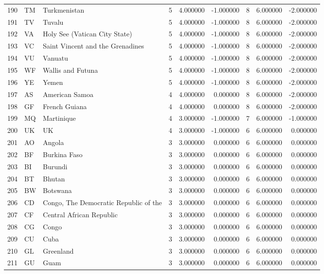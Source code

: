 \begin{tabular}{lllrrrrrr}
190 & TM & Turkmenistan & 5 & 4.000000 & -1.000000 & 8 & 6.000000 & -2.000000 \\
191 & TV & Tuvalu & 5 & 4.000000 & -1.000000 & 8 & 6.000000 & -2.000000 \\
192 & VA & Holy See (Vatican City State) & 5 & 4.000000 & -1.000000 & 8 & 6.000000 & -2.000000 \\
193 & VC & Saint Vincent and the Grenadines & 5 & 4.000000 & -1.000000 & 8 & 6.000000 & -2.000000 \\
194 & VU & Vanuatu & 5 & 4.000000 & -1.000000 & 8 & 6.000000 & -2.000000 \\
195 & WF & Wallis and Futuna & 5 & 4.000000 & -1.000000 & 8 & 6.000000 & -2.000000 \\
196 & YE & Yemen & 5 & 4.000000 & -1.000000 & 8 & 6.000000 & -2.000000 \\
197 & AS & American Samoa & 4 & 4.000000 & 0.000000 & 8 & 6.000000 & -2.000000 \\
198 & GF & French Guiana & 4 & 4.000000 & 0.000000 & 8 & 6.000000 & -2.000000 \\
199 & MQ & Martinique & 4 & 3.000000 & -1.000000 & 7 & 6.000000 & -1.000000 \\
200 & UK & UK & 4 & 3.000000 & -1.000000 & 6 & 6.000000 & 0.000000 \\
201 & AO & Angola & 3 & 3.000000 & 0.000000 & 6 & 6.000000 & 0.000000 \\
202 & BF & Burkina Faso & 3 & 3.000000 & 0.000000 & 6 & 6.000000 & 0.000000 \\
203 & BI & Burundi & 3 & 3.000000 & 0.000000 & 6 & 6.000000 & 0.000000 \\
204 & BT & Bhutan & 3 & 3.000000 & 0.000000 & 6 & 6.000000 & 0.000000 \\
205 & BW & Botswana & 3 & 3.000000 & 0.000000 & 6 & 6.000000 & 0.000000 \\
206 & CD & Congo, The Democratic Republic of the & 3 & 3.000000 & 0.000000 & 6 & 6.000000 & 0.000000 \\
207 & CF & Central African Republic & 3 & 3.000000 & 0.000000 & 6 & 6.000000 & 0.000000 \\
208 & CG & Congo & 3 & 3.000000 & 0.000000 & 6 & 6.000000 & 0.000000 \\
209 & CU & Cuba & 3 & 3.000000 & 0.000000 & 6 & 6.000000 & 0.000000 \\
210 & GL & Greenland & 3 & 3.000000 & 0.000000 & 6 & 6.000000 & 0.000000 \\
211 & GU & Guam & 3 & 3.000000 & 0.000000 & 6 & 6.000000 & 0.000000 \\

\end{tabular}
